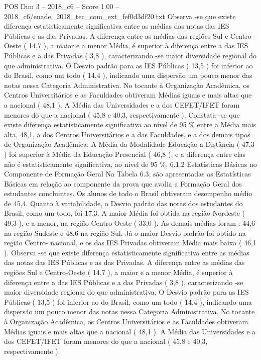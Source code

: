 \begin{textsample}{POS Dim 3 – 2018\_c6 – Score 1.00 – 2018\_c6/enade\_2018\_tec\_com\_ext\_fef0d3df20.txt}
Observa -se que existe diferença estatisticamente significativa entre as médias das notas das IES Públicas e as das Privadas.
A diferença entre as médias das regiões Sul e Centro-Oeste ( 14,7 ), a maior e a menor Média, é superior à diferença entre a das IES Públicas e a das Privadas ( 3,8 ), caracterizando -se maior diversidade regional do que administrativa.
O Desvio padrão para as IES Públicas ( 13,5 ) foi inferior ao do Brasil, como um todo ( 14,4 ), indicando uma dispersão um pouco menor das notas nessa Categoria Administrativa.
No tocante à Organização Acadêmica, os Centros Universitários e as Faculdades obtiveram Médias iguais e mais altas que a nacional ( 48,1 ).
A Média das Universidades e a dos CEFET/IFET foram menores do que a nacional ( 45,8 e 40,3, respectivamente ).
Constata -se que existe diferença estatisticamente significativa ao nível de 95 \% entre a Média mais alta, 48,1, a dos Centros Universitários e a das Faculdades, e a dos demais tipos de Organização Acadêmica.
A Média da Modalidade Educação a Distância ( 47,3 ) foi superior à Média da Educação Presencial ( 46,8 ), e a diferença entre elas não é estatisticamente significativa, ao nível de 95 \%. 6.1.2 Estatísticas Básicas no Componente de Formação Geral Na Tabela 6.3, são apresentadas as Estatísticas Básicas em relação ao componente da prova que avalia a Formação Geral dos estudantes concluintes.
Os alunos de todo o Brasil obtiveram desempenho médio de 45,4.
Quanto à variabilidade, o Desvio padrão das notas dos estudantes do Brasil, como um todo, foi 17,3.
A maior Média foi obtida na região Nordeste ( 49,3 ), e a menor, na região Centro-Oeste ( 33,0 ).
As demais médias foram : 44,6 na região Sudeste e 48,6 na região Sul.
Já o maior Desvio padrão foi obtido na região Centro- nacional, e os das IES Privadas obtiveram Média mais baixa ( 46,1 ).
Observa -se que existe diferença estatisticamente significativa entre as médias das notas das IES Públicas e as das Privadas.
A diferença entre as médias das regiões Sul e Centro-Oeste ( 14,7 ), a maior e a menor Média, é superior à diferença entre a das IES Públicas e a das Privadas ( 3,8 ), caracterizando -se maior diversidade regional do que administrativa.
O Desvio padrão para as IES Públicas ( 13,5 ) foi inferior ao do Brasil, como um todo ( 14,4 ), indicando uma dispersão um pouco menor das notas nessa Categoria Administrativa.
No tocante à Organização Acadêmica, os Centros Universitários e as Faculdades obtiveram Médias iguais e mais altas que a nacional ( 48,1 ).
A Média das Universidades e a dos CEFET/IFET foram menores do que a nacional ( 45,8 e 40,3, respectivamente ).

\end{textsample}
